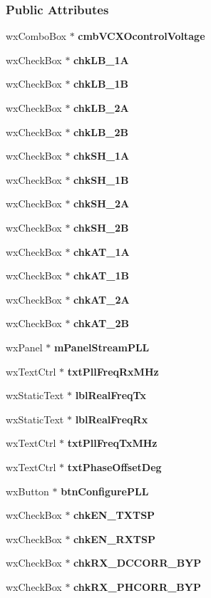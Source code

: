 \subsubsection*{Public Attributes}
\begin{DoxyCompactItemize}
\item 
wx\+Combo\+Box $\ast$ {\bf cmb\+V\+C\+X\+Ocontrol\+Voltage}
\item 
wx\+Check\+Box $\ast$ {\bf chk\+L\+B\+\_\+1A}
\item 
wx\+Check\+Box $\ast$ {\bf chk\+L\+B\+\_\+1B}
\item 
wx\+Check\+Box $\ast$ {\bf chk\+L\+B\+\_\+2A}
\item 
wx\+Check\+Box $\ast$ {\bf chk\+L\+B\+\_\+2B}
\item 
wx\+Check\+Box $\ast$ {\bf chk\+S\+H\+\_\+1A}
\item 
wx\+Check\+Box $\ast$ {\bf chk\+S\+H\+\_\+1B}
\item 
wx\+Check\+Box $\ast$ {\bf chk\+S\+H\+\_\+2A}
\item 
wx\+Check\+Box $\ast$ {\bf chk\+S\+H\+\_\+2B}
\item 
wx\+Check\+Box $\ast$ {\bf chk\+A\+T\+\_\+1A}
\item 
wx\+Check\+Box $\ast$ {\bf chk\+A\+T\+\_\+1B}
\item 
wx\+Check\+Box $\ast$ {\bf chk\+A\+T\+\_\+2A}
\item 
wx\+Check\+Box $\ast$ {\bf chk\+A\+T\+\_\+2B}
\item 
wx\+Panel $\ast$ {\bf m\+Panel\+Stream\+P\+LL}
\item 
wx\+Text\+Ctrl $\ast$ {\bf txt\+Pll\+Freq\+Rx\+M\+Hz}
\item 
wx\+Static\+Text $\ast$ {\bf lbl\+Real\+Freq\+Tx}
\item 
wx\+Static\+Text $\ast$ {\bf lbl\+Real\+Freq\+Rx}
\item 
wx\+Text\+Ctrl $\ast$ {\bf txt\+Pll\+Freq\+Tx\+M\+Hz}
\item 
wx\+Text\+Ctrl $\ast$ {\bf txt\+Phase\+Offset\+Deg}
\item 
wx\+Button $\ast$ {\bf btn\+Configure\+P\+LL}
\item 
wx\+Check\+Box $\ast$ {\bf chk\+E\+N\+\_\+\+T\+X\+T\+SP}
\item 
wx\+Check\+Box $\ast$ {\bf chk\+E\+N\+\_\+\+R\+X\+T\+SP}
\item 
wx\+Check\+Box $\ast$ {\bf chk\+R\+X\+\_\+\+D\+C\+C\+O\+R\+R\+\_\+\+B\+YP}
\item 
wx\+Check\+Box $\ast$ {\bf chk\+R\+X\+\_\+\+P\+H\+C\+O\+R\+R\+\_\+\+B\+YP}

\end{DoxyCompactItemize}
